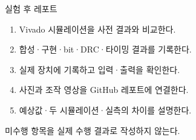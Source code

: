 \begin{frame}{실험 후 레포트}\relax
\small
\begin{enumerate}\setlength{\itemsep}{0.22cm}
\item Vivado 시뮬레이션을 사전 결과와 비교한다.
\item 합성·구현·bit·DRC·타이밍 결과를 기록한다.
\item 실제 장치에 기록하고 입력·출력을 확인한다.
\item 사진과 조작 영상을 GitHub 레포트에 연결한다.
\item 예상값·두 시뮬레이션·실측의 차이를 설명한다.
\end{enumerate}
미수행 항목을 실제 수행 결과로 작성하지 않는다.\par
\end{frame}
\endgroup


